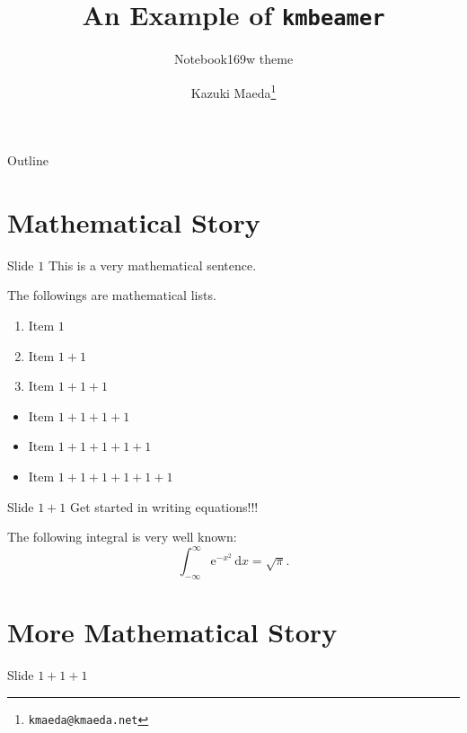 \documentclass[aspectratio=169]{beamer}
\title{An Example of \texttt{kmbeamer}}
\subtitle{Notebook169w theme}
\author{Kazuki Maeda\footnote{\texttt{kmaeda@kmaeda.net}}}
\begin{document}
\begin{frame}
  \maketitle
\end{frame}

\begin{frame}{Outline}
  \tableofcontents
\end{frame}

\section{Mathematical Story}

\begin{frame}{Slide $1$}
  This is a very mathematical sentence.

  \pause

  The followings are mathematical lists.

  \begin{enumerate}
  \item Item $1$\pause
  \item Item $1+1$\pause
  \item Item $1+1+1$
  \end{enumerate}

  \pause

  \begin{itemize}
  \item Item $1+1+1+1$\pause
  \item Item $1+1+1+1+1$\pause
  \item Item $1+1+1+1+1+1$
  \end{itemize}
\end{frame}

\begin{frame}{Slide $1+1$}
  \alert{Get started in writing equations!!!}

  \begin{theorem}
    The following integral is very well known:
    \begin{equation}
      \int_{-\infty}^\infty \mathrm{e}^{-x^2}\,\mathrm{d}x=\sqrt{\pi}.
    \end{equation}

  \end{theorem}
\end{frame}

\section{More Mathematical Story}
\begin{frame}{Slide $1+1+1$}
  \lipsum[1]
\end{frame}
\end{document}
